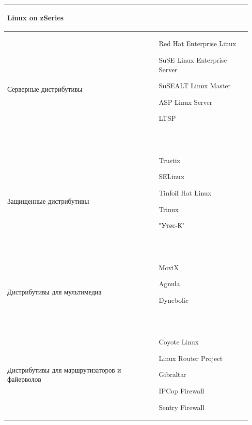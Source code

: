 \documentclass[bachelor, och, referat, times]{SCWorks}
\begin{document}
\begin{longtable}{|p{}|p{}|}
\begin{list}{•}{~}
    Linux on zSeries\end{list}
    \\\hline
    Серверные дистрибутивы &
    \begin{minipage}{\textwidth}
        \begin{list}{•}{~}
            \item Red Hat Enterprise Linux
            \item SuSE Linux Enterprise Server
            \item SuSEALT Linux Master
            \item ASP Linux Server
            \item LTSP
        \end{list}
        ~
    \end{minipage}
    \\\hline
    Защищенные дистрибутивы &
    \begin{minipage}{\textwidth}
        \begin{list}{•}{~}
            \item Trustix
            \item SELinux
            \item Tinfoil Hat Linux
            \item Trinux
            \item "Утес-К"
        \end{list}
        ~
    \end{minipage}
    \\\hline
    Дистрибутивы для мультимедиа &
    \begin{minipage}{\textwidth}
        \begin{list}{•}{~}
            \item MoviX
            \item Agnula
            \item Dynebolic
        \end{list}
        ~
    \end{minipage}
    \\\hline
    Дистрибутивы для маршрутизаторов и файерволов &
    \begin{minipage}{\textwidth}
        \begin{list}{•}{~}
            \item Coyote Linux
            \item Linux Router Project
            \item Gibraltar
            \item IPCop Firewall
            \item Sentry Firewall

\end{list}
\end{minipage}
\end{longtable}
\end{document}
